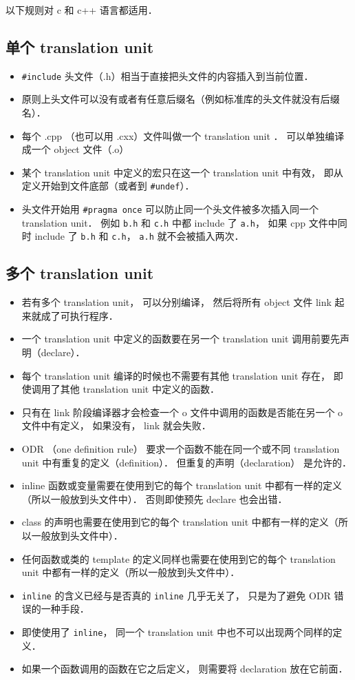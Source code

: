 
以下规则对 c 和 c++ 语言都适用．

\subsection{单个 translation unit}
\begin{itemize}
\item \lstinline|#include| 头文件（.h）相当于直接把头文件的内容插入到当前位置．
\item 原则上头文件可以没有或者有任意后缀名（例如标准库的头文件就没有后缀名）．
\item 每个 .cpp （也可以用 .cxx）文件叫做一个 translation unit ． 可以单独编译成一个 object 文件（.o）
\item 某个 translation unit 中定义的宏只在这一个 translation unit 中有效， 即从定义开始到文件底部（或者到 \lstinline|#undef|）．
\item 头文件开始用 \lstinline|#pragma once| 可以防止同一个头文件被多次插入同一个 translation unit． 例如 \lstinline|b.h| 和 \lstinline|c.h| 中都 include 了 \lstinline|a.h|， 如果 cpp 文件中同时 include 了 \lstinline|b.h| 和 \lstinline|c.h|， \lstinline|a.h| 就不会被插入两次．
\end{itemize}

\subsection{多个  translation unit}
\begin{itemize}
\item 若有多个 translation unit， 可以分别编译， 然后将所有 object 文件 link 起来就成了可执行程序．
\item 一个 translation unit 中定义的函数要在另一个 translation unit 调用前要先声明（declare）．
\item 每个 translation unit 编译的时候也不需要有其他 translation unit 存在， 即使调用了其他 translation unit 中定义的函数．
\item 只有在 link 阶段编译器才会检查一个 o 文件中调用的函数是否能在另一个 o 文件中有定义， 如果没有， link 就会失败．
\item ODR （one definition rule） 要求一个函数不能在同一个或不同 translation unit 中有重复的定义（definition）． 但重复的声明（declaration） 是允许的．
\item inline 函数或变量需要在使用到它的每个 translation unit 中都有一样的定义（所以一般放到头文件中）． 否则即使预先 declare 也会出错．
\item class 的声明也需要在使用到它的每个 translation unit 中都有一样的定义（所以一般放到头文件中）．
\item 任何函数或类的 template 的定义同样也需要在使用到它的每个 translation unit 中都有一样的定义（所以一般放到头文件中）．
\item \lstinline|inline| 的含义已经与是否真的 \lstinline|inline| 几乎无关了， 只是为了避免 ODR 错误的一种手段．
\item 即使使用了 \lstinline|inline|， 同一个 translation unit 中也不可以出现两个同样的定义．
\item 如果一个函数调用的函数在它之后定义， 则需要将 declaration 放在它前面．
\end{itemize}
